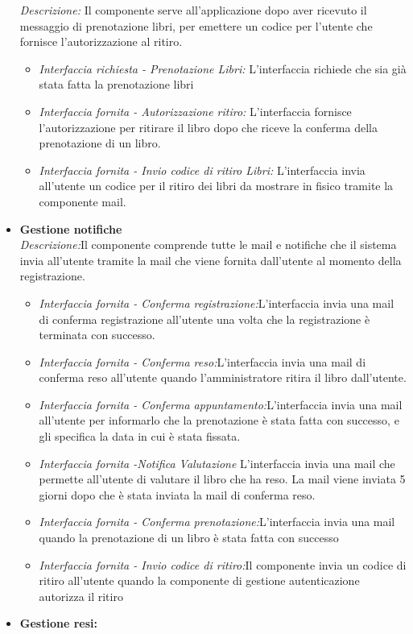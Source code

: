 \documentclass{article}
\begin{document}
\begin{itemize}
    \textit{Descrizione:} Il componente serve all'applicazione dopo aver ricevuto il messaggio di prenotazione libri, per emettere un codice per l’utente che fornisce l’autorizzazione al ritiro.
    
    \begin{itemize}
        \item \textit{Interfaccia richiesta - Prenotazione Libri:} L’interfaccia richiede che sia già stata fatta la prenotazione libri
        \item \textit{Interfaccia fornita - Autorizzazione ritiro:} L’interfaccia fornisce l’autorizzazione per ritirare il libro dopo che riceve la conferma della prenotazione di un libro.
        \item \textit{Interfaccia fornita - Invio codice di ritiro Libri:} L’interfaccia invia all’utente un codice per il ritiro dei libri da mostrare in fisico tramite la componente mail.
    \end{itemize}
    \item \textbf{Gestione notifiche}\\
    \textit{Descrizione:}Il componente comprende tutte le mail e notifiche che il sistema invia all’utente tramite la mail che viene fornita dall’utente al momento della registrazione.\\
    \begin{itemize}
        \item \textit{Interfaccia fornita - Conferma registrazione:}L’interfaccia invia una mail di conferma registrazione all'utente una volta che la registrazione è terminata con successo.
        \item \textit{Interfaccia fornita - Conferma reso:}L’interfaccia invia una mail di conferma reso all’utente quando l’amministratore ritira il libro dall'utente.
        \item \textit{Interfaccia fornita - Conferma appuntamento:}L’interfaccia invia una mail all’utente per informarlo che la prenotazione è stata fatta con successo, e gli specifica la data in cui è stata fissata.
        \item \textit{Interfaccia fornita -Notifica Valutazione} L’interfaccia invia una mail che permette all'utente di valutare il libro che ha reso. La mail viene inviata 5 giorni dopo che è stata inviata la mail di conferma reso.
        \item \textit{Interfaccia fornita - Conferma prenotazione:}L’interfaccia invia una mail quando la prenotazione di un libro è stata fatta con successo
        \item \textit{Interfaccia fornita - Invio codice di ritiro:}Il componente invia un codice di ritiro all’utente quando la componente di gestione autenticazione autorizza il ritiro
    \end{itemize}
    \item \textbf{Gestione resi:}
    

\end{itemize}
\end{document}
